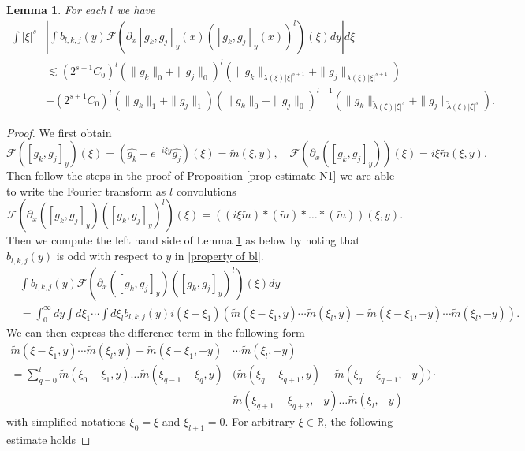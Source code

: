 \documentclass[11pt]{article}
\newcommand{\m}{\tilde{m}}
\newcommand{\tla}{\tilde{\lambda}}
\newtheorem{lemma}{Lemma}[section]
\theoremstyle{definition}
\numberwithin{equation}{section}
\begin{document}
\begin{lemma}\label{lemma_kj}
    For each $l$ we have
    \begin{align}
        \int|\xi|^s&\left|\int b_{l,k,j}(y)\mathscr{F}(\partial_x[g_k,g_j]_y(x)([g_k,g_j]_y(x))^l)(\xi)dy\right|d\xi\\
       & \lesssim (2^{s+1}C_0)^l(\|g_k\|_0+\|g_j\|_0)^l\left(\|g_k\|_{\tla(\xi)|\xi|^{s+1}}+\|g_j\|_{\tla(\xi)|\xi|^{s+1}}\right)\\
        &+(2^{s+1}C_0)^l(\|g_k\|_1+\|g_j\|_1)(\|g_k\|_0+\|g_j\|_0)^{l-1}\left(\|g_k\|_{\tla(\xi)|\xi|^{s}}+\|g_j\|_{\tla(\xi)|\xi|^{s}}\right).
    \end{align}
\end{lemma}
\begin{proof}
    We first obtain
    \begin{equation}
        \mathscr{F}([g_k,g_j]_y)(\xi)=(\hat{g_k}-e^{-i\xi y}\hat{g_j})(\xi)=\m(\xi,y),\quad\mathscr{F}(\partial_x([g_k,g_j]_y))(\xi)=i\xi \m(\xi,y).
    \end{equation}
    Then follow the steps in the proof of Proposition \ref{prop estimate N1} we are able to write the Fourier transform as $l$ convolutions
    \begin{equation}
        \mathscr{F}(\partial_x([g_k,g_j]_y)([g_k,g_j]_y)^l)(\xi)=((i\xi \m)*(\m)*\dots*(\m))(\xi,y).
    \end{equation}
    Then we compute the left hand side of Lemma \ref{lemma_kj} as below by noting that $b_{l,k,j}(y)$ is odd with respect to $y$ in \eqref{property of bl}.
    \begin{align}
        &\int b_{l,k,j}(y)\mathscr{F}(\partial_x([g_k,g_j]_y)([g_k,g_j]_y)^l)(\xi)dy\\
    &=\int_0^{\infty}dy\int d\xi_1\cdots\int d\xi_l
    b_{l,k,j}(y)i(\xi-\xi_1)(\m(\xi-\xi_1,y)\cdots \m(\xi_l,y)-\m(\xi-\xi_1,-y)\cdots \m(\xi_l,-y)).
    \end{align}
    We can then express the difference term in the following form
    \begin{align}
        \m(\xi-\xi_1,y)\cdots \m(\xi_l,y)-\m(\xi-\xi_1,-y)&\cdots \m(\xi_l,-y)\\
        =\sum\limits_{q=0}^{l}\m(\xi_0-\xi_1,y)\dots \m(\xi_{q-1}-\xi_q,y)&\Big(\m(\xi_q-\xi_{q+1},y)-\m(\xi_q-\xi_{q+1},-y)\Big)\cdot\\
    &\m(\xi_{q+1}-\xi_{q+2},-y)\dots \m(\xi_l,-y)
    \end{align}
    with simplified notations $\xi_0=\xi$ and $\xi_{l+1}=0$. For arbitrary $\xi\in\mathbb{R}$, the following estimate holds

\end{proof}
\end{document}
